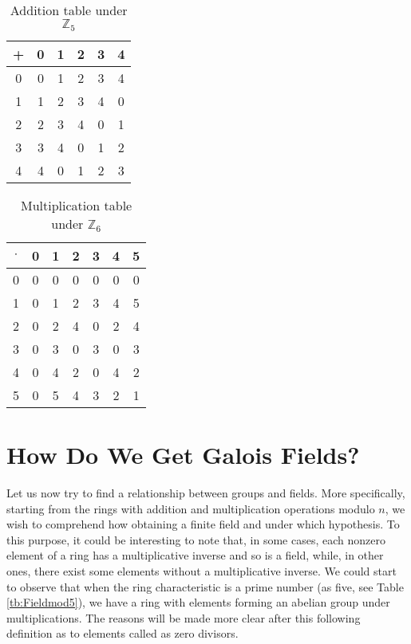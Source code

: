 \begin{table}\centering
\begin{tabular}{c| c c c c c}
+ & 0 & 1 & 2 & 3 & 4\\
\hline
0 & 0 & 1 & 2 & 3 & 4\\
1 & 1 & 2 & 3 & 4 & 0\\
2 & 2 & 3 & 4 & 0 & 1\\
3 & 3 & 4 & 0 & 1 & 2\\
4 & 4 & 0 & 1 & 2 & 3\\
\end{tabular}
\caption{Addition table under \( \mathbb Z_5\)\label{tb:Rmod5}}
\end{table}

\begin{table}\centering
\begin{tabular}{c| c c c c c c}
$\cdot$ & 0 & 1 & 2 & 3 & 4 & 5\\
\hline
0 & 0 & 0 & 0 & 0 & 0 & 0\\
1 & 0 & 1 & 2 & 3 & 4 & 5\\
2 & 0 & 2 & 4 & 0 & 2 & 4\\
3 & 0 & 3 & 0 & 3 & 0 & 3\\
4 & 0 & 4 & 2 & 0 & 4 & 2\\
5 & 0 & 5 & 4 & 3 & 2 & 1\\
\end{tabular}
\caption{Multiplication table under \( \mathbb Z_6\) \label{tb:Ringmod6}}
\end{table}


\section{How Do We Get Galois Fields?} \label{sec:GF}

Let us now try to find a relationship between groups and fields. More specifically, starting from the rings with addition and multiplication operations modulo $n$, we wish to comprehend how obtaining a finite field and under which hypothesis.
To this purpose, it could be interesting to note that, in some cases, each nonzero element of a ring has a multiplicative inverse and so is a field, while, in other ones, there exist some elements without a multiplicative inverse. We could start to observe that when the ring characteristic is a prime number (as five, see Table \ref{tb:Fieldmod5}), we have a ring with elements forming an abelian group under multiplications. The reasons will be made more clear after this following definition as to elements called as zero divisors.

